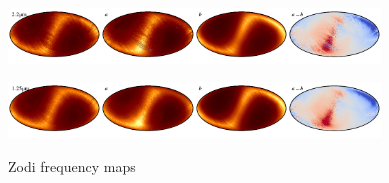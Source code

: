 \documentclass{aa}
\begin{document}
\begin{figure}
    \includegraphics[width=0.22\textwidth]{figs/zodi/zodi_02_tot.pdf}\includegraphics[width=0.22\textwidth]{figs/zodi/zodi_02_a.pdf}\includegraphics[width=0.22\textwidth]{figs/zodi/zodi_09_b.pdf}\includegraphics[width=0.22\textwidth]{figs/zodi/zodi_02_a-b.pdf}
    \vspace{-0.3cm}

    \includegraphics[width=0.22\textwidth]{figs/zodi/zodi_01_tot.pdf}\includegraphics[width=0.22\textwidth]{figs/zodi/zodi_01_a.pdf}\includegraphics[width=0.22\textwidth]{figs/zodi/zodi_10_b.pdf}\includegraphics[width=0.22\textwidth]{figs/zodi/zodi_01_a-b.pdf}

    \caption{Zodi frequency maps}
    \label{fig:zodi_freq}
  \end{figure}
\end{document}
